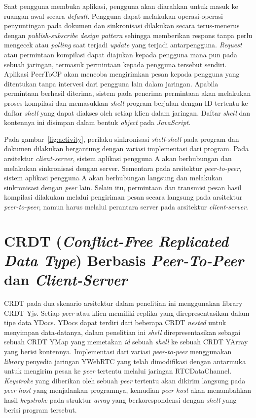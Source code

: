Saat pengguna membuka aplikasi, pengguna akan diarahkan untuk masuk ke ruangan awal secara \textit{default}. Pengguna dapat melakukan operasi-operasi penyuntingan pada dokumen dan sinkronisasi dilakukan secara terus-menerus dengan \textit{publish-subscribe design pattern} sehingga memberikan respons tanpa perlu mengecek atau \textit{polling} saat terjadi \textit{update} yang terjadi antarpengguna. \textit{Request} atau permintaan kompilasi dapat diajukan kepada pengguna mana pun pada sebuah jaringan, termasuk permintaan kepada pengguna tersebut sendiri. Aplikasi PeerToCP akan mencoba mengirimkan pesan kepada pengguna yang ditentukan tanpa intervesi dari pengguna lain dalam jaringan. Apabila permintaan berhasil diterima, sistem pada penerima permintaan akan melakukan proses kompilasi dan memasukkan \textit{shell} program berjalan dengan ID tertentu ke daftar \textit{shell} yang dapat diakses oleh setiap klien dalam jaringan. Daftar \textit{shell} dan kontennya ini disimpan dalam bentuk \textit{object} pada \textit{JavaScript}.

Pada gambar~\ref{fig:activity}, perilaku sinkronisasi \textit{shell}-\textit{shell} pada program dan dokumen dilakukan bergantung dengan variasi implementasi dari program. Pada arsitektur \textit{client-server}, sistem aplikasi pengguna A akan berhubungan dan melakukan sinkronisasi dengan server. Sementara pada arsitektur \textit{peer-to-peer}, sistem aplikasi pengguna A akan berhubungan langsung dan melakukan sinkronisasi dengan \textit{peer} lain. Selain itu, permintaan dan transmisi pesan hasil kompilasi dilakukan melalui pengiriman pesan secara langsung pada arsitektur \textit{peer-to-peer}, namun harus melalui perantara server pada arsitektur \textit{client-server}.

\section{CRDT (\textit{Conflict-Free Replicated Data Type}) Berbasis \textit{Peer-To-Peer} dan \textit{Client-Server}}
\label{sec:desain_crdt}

CRDT pada dua skenario arsitektur dalam penelitian ini menggunakan library CRDT Yjs. Setiap \textit{peer} atau klien memiliki replika yang direpresentasikan dalam tipe data YDocs. YDocs dapat terdiri dari beberapa CRDT \textit{nested} untuk menyimpan data-datanya, dalam penelitian ini \textit{shell} direpresentasikan sebagai sebuah CRDT YMap yang memetakan \textit{id} sebuah \textit{shell} ke sebuah CRDT YArray yang berisi kontennya. Implementasi dari variasi \textit{peer-to-peer} menggunakan \textit{library} penyedia jaringan YWebRTC yang telah dimodifikasi dengan antarmuka untuk mengirim pesan ke \textit{peer} tertentu melalui jaringan RTCDataChannel. \textit{Keystroke} yang diberikan oleh sebuah \textit{peer} tertentu akan dikirim langsung pada \textit{peer host} yang menjalankan programnya, kemudian \textit{peer host} akan menambahkan hasil \textit{keystroke} pada struktur \textit{array} yang berkorespondensi dengan \textit{shell} yang berisi program tersebut.

